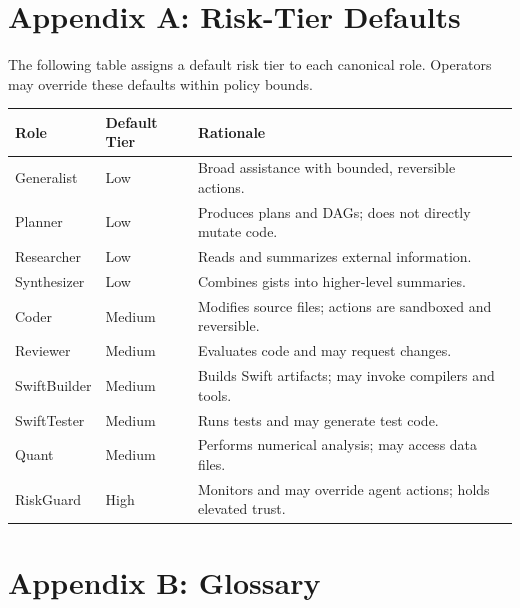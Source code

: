 \documentclass[12pt,letterpaper]{article}
\begin{document}
\section{Appendix A: Risk-Tier Defaults}
\label{appendix:risk-tiers}

The following table assigns a default risk tier to each canonical role. Operators may override these defaults within policy bounds.

\begin{longtable}{|p{5cm}|p{4cm}|p{5cm}|}
\hline
\textbf{Role} & \textbf{Default Tier} & \textbf{Rationale} \\
\hline
\endhead
Generalist & Low & Broad assistance with bounded, reversible actions. \\
\hline
Planner & Low & Produces plans and DAGs; does not directly mutate code. \\
\hline
Researcher & Low & Reads and summarizes external information. \\
\hline
Synthesizer & Low & Combines gists into higher-level summaries. \\
\hline
Coder & Medium & Modifies source files; actions are sandboxed and reversible. \\
\hline
Reviewer & Medium & Evaluates code and may request changes. \\
\hline
SwiftBuilder & Medium & Builds Swift artifacts; may invoke compilers and tools. \\
\hline
SwiftTester & Medium & Runs tests and may generate test code. \\
\hline
Quant & Medium & Performs numerical analysis; may access data files. \\
\hline
RiskGuard & High & Monitors and may override agent actions; holds elevated trust. \\
\hline
\end{longtable}

\section{Appendix B: Glossary}
\label{appendix:glossary}
\end{document}
